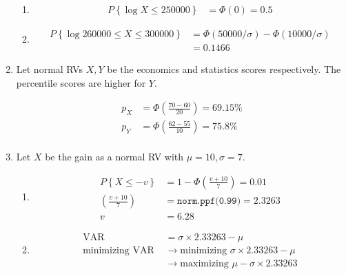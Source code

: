 \begin{enumerate}
		\begin{enumerate}
			\item \begin{align}
				P \left\{\log X \leq 250000\right\} &= \Phi(0) = 0.5
			\end{align}
			
			\item \begin{align}
				P \left\{\log 260000 \leq X \leq 300000\right\} &= \Phi(50000 / \sigma) - \Phi(10000/ \sigma) \nonumber \\
				&= 0.1466 
			\end{align}
		\end{enumerate}
	
	
	\item Let normal RVs $ X, Y $ be the economics and statistics scores respectively. The percentile scores are higher for $ Y $.
			
		\begin{align}
			p_X &= \Phi \left(\frac{70-60}{20}\right) = 69.15\% \nonumber \\
			p_Y &= \Phi \left(\frac{62-55}{10}\right) = 75.8\% \nonumber \\
		\end{align}
	
	
	\item Let $ X $ be the gain as a normal RV with $ \mu = 10, \sigma = 7 $.
			
		\begin{enumerate}
			\item \begin{align}
				P \left\{X \leq -v\right\} &= 1 - \Phi \left(\frac{v + 10}{7}\right) = 0.01 \nonumber \\
				\left(\frac{v + 10}{7}\right) &= \texttt{norm.ppf(0.99)} = 2.3263 \nonumber \\
				v &= 6.28
			\end{align}
			
			\item \begin{align}
				\mathrm{VAR} &= \sigma \times 2.33263 - \mu \nonumber \\
				\text{minimizing VAR } &\to \text{minimizing } \sigma \times 2.33263 - \mu \nonumber \\
				&\to \text{maximizing }  \mu - \sigma \times 2.33263
			\end{align}
		\end{enumerate}
	

\end{enumerate}
